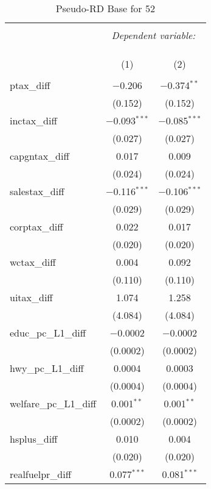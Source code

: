 
\begin{table}[!htbp] \centering 
  \caption{Pseudo-RD Base for  52} 
  \label{} 
\begin{tabular}{@{\extracolsep{5pt}}lcc} 
\\[-1.8ex]\hline 
\hline \\[-1.8ex] 
 & \multicolumn{2}{c}{\textit{Dependent variable:}} \\ 
\cline{2-3} 
\\[-1.8ex] & \multicolumn{2}{c}{ } \\ 
\\[-1.8ex] & (1) & (2)\\ 
\hline \\[-1.8ex] 
 ptax\_diff & $-$0.206 & $-$0.374$^{**}$ \\ 
  & (0.152) & (0.152) \\ 
  inctax\_diff & $-$0.093$^{***}$ & $-$0.085$^{***}$ \\ 
  & (0.027) & (0.027) \\ 
  capgntax\_diff & 0.017 & 0.009 \\ 
  & (0.024) & (0.024) \\ 
  salestax\_diff & $-$0.116$^{***}$ & $-$0.106$^{***}$ \\ 
  & (0.029) & (0.029) \\ 
  corptax\_diff & 0.022 & 0.017 \\ 
  & (0.020) & (0.020) \\ 
  wctax\_diff & 0.004 & 0.092 \\ 
  & (0.110) & (0.110) \\ 
  uitax\_diff & 1.074 & 1.258 \\ 
  & (4.084) & (4.084) \\ 
  educ\_pc\_L1\_diff & $-$0.0002 & $-$0.0002 \\ 
  & (0.0002) & (0.0002) \\ 
  hwy\_pc\_L1\_diff & 0.0004 & 0.0003 \\ 
  & (0.0004) & (0.0004) \\ 
  welfare\_pc\_L1\_diff & 0.001$^{**}$ & 0.001$^{**}$ \\ 
  & (0.0002) & (0.0002) \\ 
  hsplus\_diff & 0.010 & 0.004 \\ 
  & (0.020) & (0.020) \\ 
  realfuelpr\_diff & 0.077$^{***}$ & 0.081$^{***}$ \\ 

\end{tabular}
\end{table}
